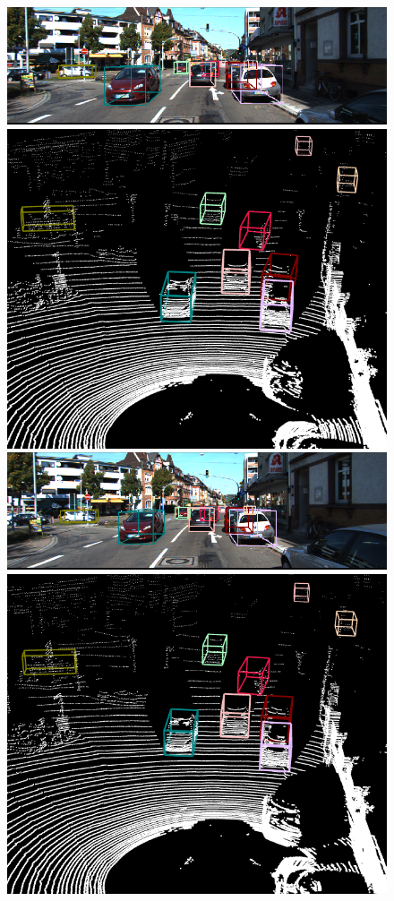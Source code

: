 \documentclass{bmvc2k}
\begin{document}
\begin{figure}
{\begin{minipage}[b]{0.45\linewidth}
	\includegraphics[width=0.85\linewidth]{images/supplementary/11/img/03.png}\vspace{1.5pt}
	\includegraphics[trim={0cm, 5.5cm, 0cm, 0cm}, clip,width=0.85\linewidth]{images/supplementary/11/pc/02.png}\vspace{1pt}
	\includegraphics[width=0.85\linewidth]{images/supplementary/11/img/02.png}\vspace{1.5pt}
	\includegraphics[trim={0cm, 5.5cm, 0cm, 0cm}, clip,width=0.85\linewidth]{images/supplementary/11/pc/01.png}\vspace{1pt}

\end{minipage}}
\end{figure}
\end{document}
